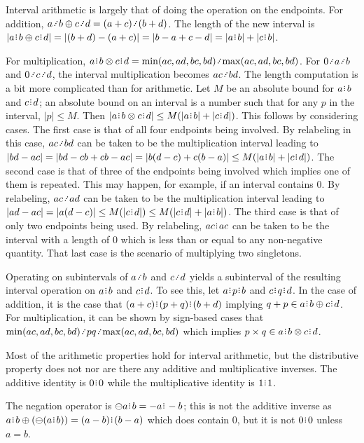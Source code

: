 \documentclass[12pt]{article}
\begin{document}
Interval arithmetic is largely that of doing the operation on the endpoints. For addition, $a \lte b \oplus c \lte d = (a+c) \lte (b+d)$. The length of the new interval is $|a\rint b \oplus c\rint d| = |(b+d) - (a + c)| = |b-a+ c-d| = |a\rint b|+|c\rint b|$.

For multiplication, $a\rint b \otimes c\rint d = \min(ac, ad, bc, bd)\lte \max(ac, ad, bc, bd)$. For $0 \lte a \lte b$ and $0 \lte c \lte d$, the interval multiplication becomes $ac \lte bd$. The length computation is a bit more complicated than for arithmetic. Let $M$ be an absolute bound for $a\rint b$ and $c\rint d$; an absolute bound on an interval is a number such that for any $p$ in the interval, $|p| \leq M$. Then $|a\rint b \otimes c\rint d| \leq M(|a\rint b| + |c\rint d|)$. This follows by considering cases. The first case is that of all four endpoints being involved. By relabeling in this case,  $ac \lte bd$ can be taken to be the multiplication interval leading to $|bd - ac| = |bd - cb + cb - ac| = |b(d-c) + c (b-a)| \leq M (|a\rint b| + |c\rint d|)$. The second case is that of three of the endpoints being involved which implies one of them is repeated. This may happen, for example, if an interval contains 0. By relabeling, $ac \lte ad$ can be taken to be the multiplication interval leading to $|ad - ac| = |a(d-c)| \leq  M (|c\rint d|) \leq M (|c\rint d| + |a\rint b|)$. The third case is that of only two endpoints being used. By relabeling, $ac\rint ac$ can be taken to be the interval with a length of 0 which is less than or equal to any non-negative quantity.  That last case is the scenario of multiplying two singletons. 

 Operating on subintervals of $a \lte b$ and $c \lte d$ yields a subinterval of the resulting interval operation on $a\rint b$ and $c\rint d$. To see this, let $a\rint p \rint b$ and $c\rint q \rint d$. In the case of addition, it is the case that $(a+c) \rint (p + q) \rint (b+d)$ implying $q+p  \in a\rint b \oplus c\rint d$. For multiplication, it can be shown by sign-based cases  that $\min(ac, ad, bc, bd)\lte pq \lte \max(ac, ad, bc, bd)$ which implies $p \times q \in a\rint b \otimes c\rint d$. 

Most of the arithmetic properties hold for interval arithmetic, but the distributive property does not nor are there any additive and multiplicative inverses. The additive identity is $0\rint 0$ while the multiplicative identity is $1\rint 1$.

The negation operator is $\ominus a\rint b  = -a\rint -b$; this is not the additive inverse as $a\rint b \oplus (\ominus(a \rint b )) = (a-b)\rint (b-a)$ which does contain 0, but it is not $0\rint 0$ unless $a = b$. 
\end{document}
